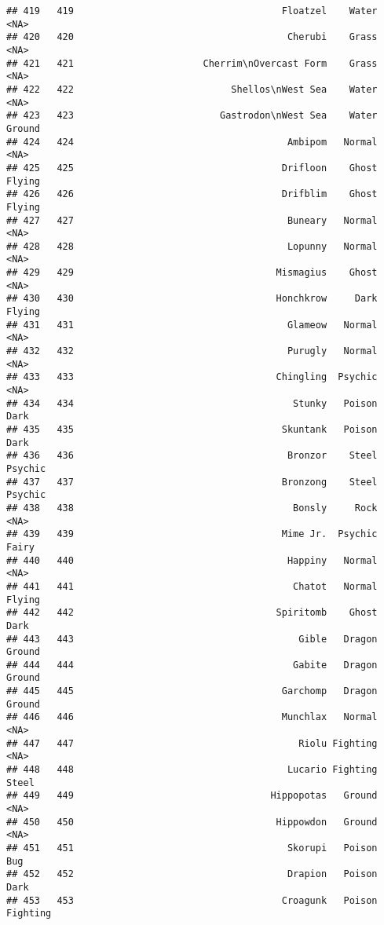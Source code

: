 \documentclass[
]{article}
\begin{document}
\begin{verbatim}
## 419   419                                     Floatzel    Water     <NA>
## 420   420                                      Cherubi    Grass     <NA>
## 421   421                       Cherrim\nOvercast Form    Grass     <NA>
## 422   422                            Shellos\nWest Sea    Water     <NA>
## 423   423                          Gastrodon\nWest Sea    Water   Ground
## 424   424                                      Ambipom   Normal     <NA>
## 425   425                                     Drifloon    Ghost   Flying
## 426   426                                     Drifblim    Ghost   Flying
## 427   427                                      Buneary   Normal     <NA>
## 428   428                                      Lopunny   Normal     <NA>
## 429   429                                    Mismagius    Ghost     <NA>
## 430   430                                    Honchkrow     Dark   Flying
## 431   431                                      Glameow   Normal     <NA>
## 432   432                                      Purugly   Normal     <NA>
## 433   433                                    Chingling  Psychic     <NA>
## 434   434                                       Stunky   Poison     Dark
## 435   435                                     Skuntank   Poison     Dark
## 436   436                                      Bronzor    Steel  Psychic
## 437   437                                     Bronzong    Steel  Psychic
## 438   438                                       Bonsly     Rock     <NA>
## 439   439                                     Mime Jr.  Psychic    Fairy
## 440   440                                      Happiny   Normal     <NA>
## 441   441                                       Chatot   Normal   Flying
## 442   442                                    Spiritomb    Ghost     Dark
## 443   443                                        Gible   Dragon   Ground
## 444   444                                       Gabite   Dragon   Ground
## 445   445                                     Garchomp   Dragon   Ground
## 446   446                                     Munchlax   Normal     <NA>
## 447   447                                        Riolu Fighting     <NA>
## 448   448                                      Lucario Fighting    Steel
## 449   449                                   Hippopotas   Ground     <NA>
## 450   450                                    Hippowdon   Ground     <NA>
## 451   451                                      Skorupi   Poison      Bug
## 452   452                                      Drapion   Poison     Dark
## 453   453                                     Croagunk   Poison Fighting

\end{verbatim}
\end{document}
